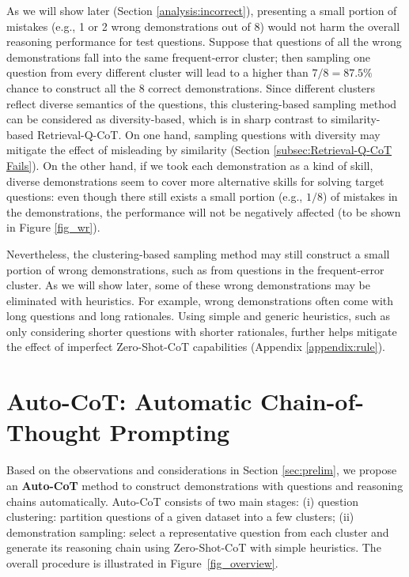 As we will show later (Section \ref{analysis:incorrect}), presenting a small portion of mistakes (e.g., 1 or 2 wrong demonstrations out of 8) would not harm the overall reasoning performance for test questions. 
Suppose that questions of all the wrong demonstrations fall into the same frequent-error cluster; then sampling one question from every different cluster will lead to a higher than $7/8=87.5\%$ chance to construct all the 8 correct demonstrations.
Since different clusters reflect diverse semantics of the questions, this clustering-based sampling method can be considered as diversity-based, which is in sharp contrast to similarity-based Retrieval-Q-CoT.
On one hand, sampling questions with diversity may mitigate the effect of misleading by similarity (Section \ref{subsec:Retrieval-Q-CoT Fails}). 
On the other hand, if we took each demonstration as a kind of skill, diverse demonstrations seem to cover more alternative skills for solving target questions: even though there still exists a small portion (e.g., $1/8$) of mistakes in the demonstrations, the performance will not be negatively affected (to be shown in Figure \ref{fig_wr}).

Nevertheless, the clustering-based sampling method may still construct a small portion of wrong demonstrations, such as from questions in the frequent-error cluster.
As we will show later, some of these wrong demonstrations may be eliminated with heuristics. 
For example, wrong demonstrations often come with long questions and long rationales. 
Using simple and generic heuristics, such as only considering shorter questions with shorter rationales, further helps mitigate the effect of imperfect Zero-Shot-CoT capabilities (Appendix \ref{appendix:rule}). 

\section{Auto-CoT: Automatic Chain-of-Thought Prompting}
\label{sec:proposal}

Based on the observations and considerations in Section \ref{sec:prelim}, we propose an \textbf{Auto-CoT} method to construct demonstrations with questions and reasoning chains automatically. Auto-CoT consists of two main stages: (i) question clustering: partition questions of a given dataset into a few clusters; (ii) demonstration sampling: select a representative question from each cluster and generate its reasoning chain using Zero-Shot-CoT with simple heuristics. The overall procedure is illustrated in Figure~\ref{fig_overview}. 

